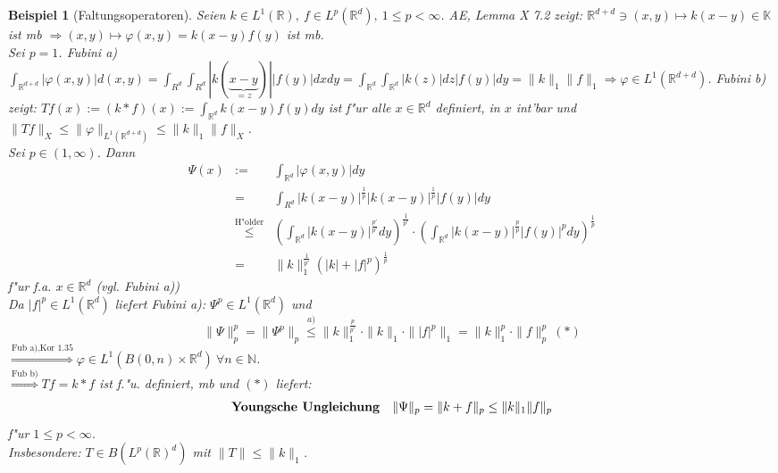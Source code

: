 \documentclass[a4paper,11pt]{book}
\newcommand{\R}{{\mathbb R}}
\newcommand{\N}{{\mathbb N}}
\newcommand{\K}{{\mathbb K}}
\newcommand{\begriff}[1]{\textbf{#1}} %
\newtheorem{Bsp}[Def]{Beispiel}
\theoremstyle{nonumberplain}
\begin{document}
\begin{Bsp}[Faltungsoperatoren]
Seien $k \in L^1(\R),\ f \in L^p(\R^d),\ 1 \leq p < \infty$. AE, Lemma X 7.2 zeigt: $\R^{d +d} \ni (x,y) \mapsto k(x-y) \in \K$ ist mb $\Rightarrow (x,y) \mapsto \varphi(x,y) = k(x-y)f(y)$ ist mb.\\
Sei $p = 1$. Fubini a) $\int_{\R^{d+d}} |\varphi(x,y)| d(x,y) = \int_{R^d} \int_{R^d} |k( \underbrace{x-y}_{= z} )| |f(y)| dx dy = \int_{\R^d} \int_{\R^d} |k(z)|dz |f(y)|dy = \|k\|_1 \|f\|_1 \Rightarrow \varphi \in L^1(\R^{d+d})$. Fubini b) zeigt: $Tf(x) := (k \ast f)(x) := \int_{\R^d} k(x-y) f(y) dy$ ist f"ur alle $x \in \R^d$ definiert, in $x$ int'bar und $\|Tf\|_X \leq \|\varphi\|_{L^1(\R^{d+d})} \leq \|k\|_1 \|f\|_X$.\\
Sei $p \in (1,\infty)$. Dann
\begin{eqnarray*}
\Psi(x) & := & \int_{\R^d} |\varphi(x,y)|dy \\
& = & \int_{R^d} |k(x-y)|^{\frac1{p}} |k(x-y)|^{\frac1{p}} |f(y)|dy \\
& \stackrel{\text{H"older}}{\leq} & ( \int_{\R^d} |k(x-y)|^{\frac{p'}{p'}} dy)^{\frac1{p'}} \cdot (\int_{\R^d} |k(x-y)|^{\frac{p}{p}} |f(y)|^p dy)^{\frac1{p}} \\
& = & \|k\|_1^{\frac1{p'}} (|k| + |f|^p)^{\frac1{p}}
\end{eqnarray*}
f"ur f.a. $x \in \R^d$ (vgl. Fubini a))\\
Da $|f|^p \in L^1(\R^d)$ liefert Fubini a): $\Psi^p \in L^1(\R^d)$ und
\[
\| \Psi \|_p^p = \| \Psi^p \|_p \stackrel{a)}{\leq} \|k\|_1^{\frac{p}{p'}} \cdot \|k\|_1 \cdot \| |f|^p \|_1 = \| k \|_1^p \cdot \|f\|_p^p \ (\ast)
\]
$\stackrel{\text{Fub a),Kor 1.35}}{\Longrightarrow} \varphi \in L^1(B(0,n) \times \R^d)\ \forall n \in \N$.\\
$\stackrel{\text{Fub b)}}{\Longrightarrow} Tf = k \ast f$ ist f."u. definiert, mb und $(\ast)$ liefert:
\begin{eqnarray}
\text{\begriff{Youngsche Ungleichung}} \quad \| \Psi \|_p = \| k + f \|_p \leq \|k\|_1 \|f\|_p
\end{eqnarray}
f"ur $1 \leq p < \infty$.\\
Insbesondere: $T \in B(L^p(\R)^d)$ mit $\|T\| \leq \|k\|_1$.
\end{Bsp}
\end{document}

